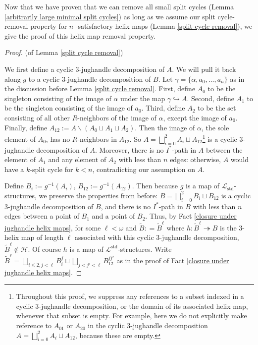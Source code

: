 \documentclass{amsart}
\theoremstyle{definition}
\theoremstyle{remark}
\numberwithin{equation}{section}
\begin{document}
Now that we have proven that we can remove all small split cycles (Lemma \ref{arbitrarily large minimal split cycles}) as long as we assume our split cycle-removal property for $n$ -satisfactory helix maps (Lemma \ref{split cycle removal}), we give the proof of this helix map removal property.


\begin{proof}
 (of Lemma \ref{split cycle removal})  

 We first define a cyclic $3$-jughandle decomposition of $A$. We will pull it back along $g$ to a cyclic $3$-jughandle decomposition of $B$. Let $\gamma = \{\alpha, a_0, \ldots, a_{n}\}$ as in the discussion before Lemma \ref{split cycle removal}. First, define $A_0$ to be the singleton consisting of the image of $\alpha$ under the map $\gamma \hookrightarrow A$. Second, define $A_1$ to be the singleton consisting of the image of $a_0$. Third, define $A_2$ to be the set consisting of all other $R$-neighbors of the image of $\alpha$, except the image of $a_0$. Finally, define $A_{12} := A \backslash (A_0 \sqcup A_1 \sqcup A_2)$. Then the image of $\alpha$, the sole element of $A_{0}$, has no $R$-neighbors in $A_{12}$. So $A = \bigsqcup^{2}_{i=0} A_i \sqcup A_{12}$\footnote{Throughout this proof, we suppress any references to a subset indexed in a cyclic $3$-jughandle decomposition, or the domain of its associated helix map, whenever that subset is empty. For example, here we do not explicitly make reference to $A_{01}$ or $A_{20}$ in the cyclic $3$-jughandle decomposition  $A = \bigsqcup^{2}_{i=0} A_i \sqcup A_{12}$, because these are empty.} is a cyclic $3$-jughandle decomposition of $A$. Moreover, there is no $I^{*}$-path in $A$ between the element of $A_1$ and any element of $A_{2}$ with less than $n$ edges: otherwise, $A$ would have a $k$-split cycle for $k < n$, contradicting our assumption on $A$.

  Define $B_i := g^{-1}(A_i)$, $B_{12} := g^{-1}(A_{12})$. Then because $g$ is a map of $\mathcal{L}_{\mathrm{std}}$-structures, we preserve the properties from before: $B = \bigsqcup^{2}_{i=0} B_i \sqcup B_{12}$ is a cyclic $3$-jughandle decomposition of $B$, and there is no $I^{*}$-path in $B$ with less than $n$ edges between a point of $B_1$ and a point of $B_2$. Thus, by Fact \ref{closure under jughandle helix maps}, for some $\ell < \omega$ and $\tilde{B} : = \tilde{B}^{\ell}$ where $h: \tilde{B}^{\ell} \twoheadrightarrow B $ is the $3$-helix map of length $\ell$ associated with this cyclic $3$-jughandle decomposition, $\tilde{B}^{\ell} \notin \mathcal{H}$. Of course $h$ is a map of $\mathcal{L}^{\mathrm{std}}$-structures. Write $\tilde{B}^{\ell} = \bigsqcup_{i \leq 2, j < \ell} B_{i}^{j} 
\sqcup \bigsqcup_{j < j' < \ell} B_{12}^{jj'}$ as in the proof of Fact \ref{closure under jughandle helix maps}. 



\end{proof}
\end{document}
